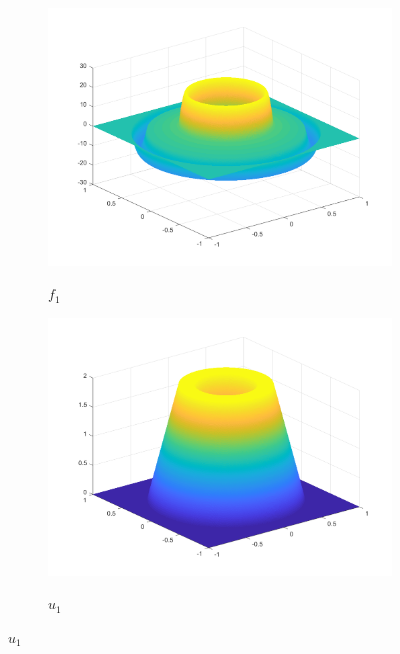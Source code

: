 \begin{figure}[!ht]
  \centering
  \begin{subfigure}[b]{.48\linewidth}
    \caption{$f_1$}
    \includegraphics[trim = 40 30 30 30, clip, width=\linewidth]
      {pictures/chapExperiments/secGeneralInfo/f01Plots/inSi.png}
    \label{fig:f01InSi}
  \end{subfigure}
  \quad
  \begin{subfigure}[b]{.48\linewidth}
    \caption{$u_1$}
    \includegraphics[trim = 40 30 30 30, clip, width=\linewidth]
      {pictures/chapExperiments/secGeneralInfo/f01Plots/exactSolution.png}
    \label{fig:f01ExactSol}
  \end{subfigure}


\end{figure}
